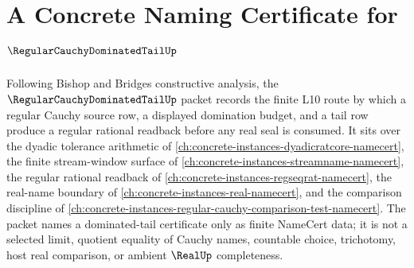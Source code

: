 \chapter{A Concrete Naming Certificate for $\RegularCauchyDominatedTailUp$}
\label{ch:concrete-instances-regular-cauchy-dominated-tail-namecert}

Following Bishop and Bridges constructive analysis, the $\RegularCauchyDominatedTailUp$ packet records the finite L10 route by which a regular Cauchy source row, a displayed domination budget, and a tail row produce a regular rational readback before any real seal is consumed. It sits over the dyadic tolerance arithmetic of \autoref{ch:concrete-instances-dyadicratcore-namecert}, the finite stream-window surface of \autoref{ch:concrete-instances-streamname-namecert}, the regular rational readback of \autoref{ch:concrete-instances-regseqrat-namecert}, the real-name boundary of \autoref{ch:concrete-instances-real-namecert}, and the comparison discipline of \autoref{ch:concrete-instances-regular-cauchy-comparison-test-namecert}. The packet names a dominated-tail certificate only as finite NameCert data; it is not a selected limit, quotient equality of Cauchy names, countable choice, trichotomy, host real comparison, or ambient $\RealUp$ completeness.


